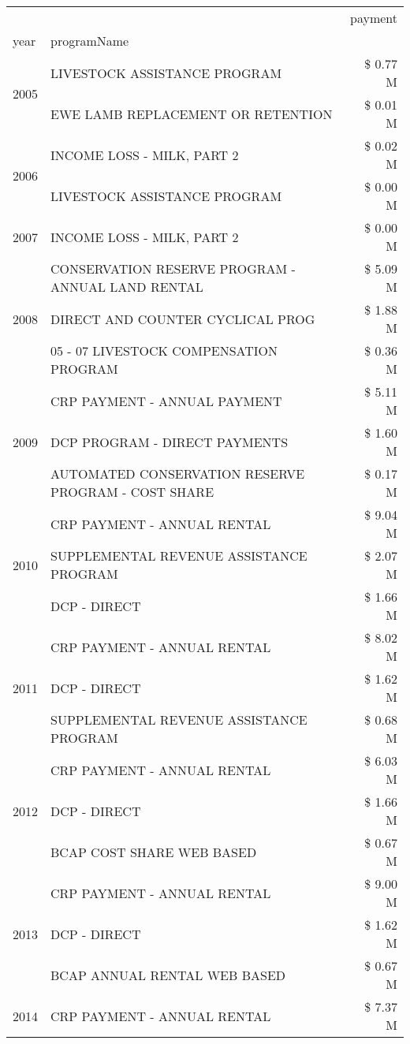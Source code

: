\begin{tabular}{llr}
\toprule
 &  & payment \\
year & programName &  \\
\midrule
\multirow[t]{2}{*}{2005} & LIVESTOCK ASSISTANCE PROGRAM & \$ 0.77 M \\
 & EWE LAMB REPLACEMENT OR RETENTION & \$ 0.01 M \\
\cline{1-3}
\multirow[t]{2}{*}{2006} & INCOME LOSS - MILK, PART 2 & \$ 0.02 M \\
 & LIVESTOCK ASSISTANCE PROGRAM & \$ 0.00 M \\
\cline{1-3}
2007 & INCOME LOSS - MILK, PART 2 & \$ 0.00 M \\
\cline{1-3}
\multirow[t]{3}{*}{2008} & CONSERVATION RESERVE PROGRAM - ANNUAL LAND RENTAL & \$ 5.09 M \\
 & DIRECT AND COUNTER CYCLICAL PROG & \$ 1.88 M \\
 & 05 - 07 LIVESTOCK COMPENSATION PROGRAM & \$ 0.36 M \\
\cline{1-3}
\multirow[t]{3}{*}{2009} & CRP PAYMENT - ANNUAL PAYMENT & \$ 5.11 M \\
 & DCP PROGRAM - DIRECT PAYMENTS & \$ 1.60 M \\
 & AUTOMATED CONSERVATION RESERVE PROGRAM - COST SHARE & \$ 0.17 M \\
\cline{1-3}
\multirow[t]{3}{*}{2010} & CRP PAYMENT - ANNUAL RENTAL & \$ 9.04 M \\
 & SUPPLEMENTAL REVENUE ASSISTANCE PROGRAM & \$ 2.07 M \\
 & DCP - DIRECT & \$ 1.66 M \\
\cline{1-3}
\multirow[t]{3}{*}{2011} & CRP PAYMENT - ANNUAL RENTAL & \$ 8.02 M \\
 & DCP - DIRECT & \$ 1.62 M \\
 & SUPPLEMENTAL REVENUE ASSISTANCE PROGRAM & \$ 0.68 M \\
\cline{1-3}
\multirow[t]{3}{*}{2012} & CRP PAYMENT - ANNUAL RENTAL & \$ 6.03 M \\
 & DCP - DIRECT & \$ 1.66 M \\
 & BCAP COST SHARE WEB BASED & \$ 0.67 M \\
\cline{1-3}
\multirow[t]{3}{*}{2013} & CRP PAYMENT - ANNUAL RENTAL & \$ 9.00 M \\
 & DCP - DIRECT & \$ 1.62 M \\
 & BCAP ANNUAL RENTAL WEB BASED & \$ 0.67 M \\
\cline{1-3}
\multirow[t]{3}{*}{2014} & CRP PAYMENT - ANNUAL RENTAL & \$ 7.37 M \\

\end{tabular}
